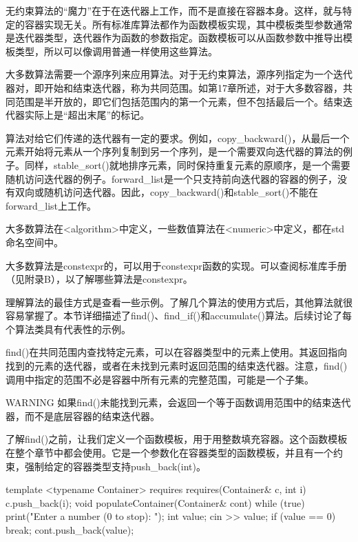 
无约束算法的“魔力”在于在迭代器上工作，而不是直接在容器本身。这样，就与特定的容器实现无关。所有标准库算法都作为函数模板实现，其中模板类型参数通常是迭代器类型，迭代器作为函数的参数指定。函数模板可以从函数参数中推导出模板类型，所以可以像调用普通一样使用这些算法。

大多数算法需要一个源序列来应用算法。对于无约束算法，源序列指定为一个迭代器对，即开始和结束迭代器，称为共同范围。如第17章所述，对于大多数容器，共同范围是半开放的，即它们包括范围内的第一个元素，但不包括最后一个。结束迭代器实际上是“超出末尾”的标记。

算法对给它们传递的迭代器有一定的要求。例如，copy\_backward()，从最后一个元素开始将元素从一个序列复制到另一个序列，是一个需要双向迭代器的算法的例子。同样，stable\_sort()就地排序元素，同时保持重复元素的原顺序，是一个需要随机访问迭代器的例子。forward\_list是一个只支持前向迭代器的容器的例子，没有双向或随机访问迭代器。因此，copy\_backward()和stable\_sort()不能在forward\_list上工作。

大多数算法在<algorithm>中定义，一些数值算法在<numeric>中定义，都在std命名空间中。

大多数算法是constexpr的，可以用于constexpr函数的实现。可以查阅标准库手册（见附录B），以了解哪些算法是constexpr。

理解算法的最佳方式是查看一些示例。了解几个算法的使用方式后，其他算法就很容易掌握了。本节详细描述了find()、find\_if()和accumulate()算法。后续讨论了每个算法类具有代表性的示例。


find()在共同范围内查找特定元素，可以在容器类型中的元素上使用。其返回指向找到的元素的迭代器，或者在未找到元素时返回范围的结束迭代器。注意，find()调用中指定的范围不必是容器中所有元素的完整范围，可能是一个子集。

\begin{myWarning}{WARNING}
如果find()未能找到元素，会返回一个等于函数调用范围中的结束迭代器，而不是底层容器的结束迭代器。
\end{myWarning}

了解find()之前，让我们定义一个函数模板，用于用整数填充容器。这个函数模板在整个章节中都会使用。它是一个参数化在容器类型的函数模板，并且有一个约束，强制给定的容器类型支持push\_back(int)。

\begin{cpp}
template <typename Container>
    requires requires(Container& c, int i) { c.push_back(i); }
void populateContainer(Container& cont)
{
    while (true) {
        print("Enter a number (0 to stop): ");
        int value;
        cin >> value;
        if (value == 0) { break; }
        cont.push_back(value);
    }
}
\end{cpp}

